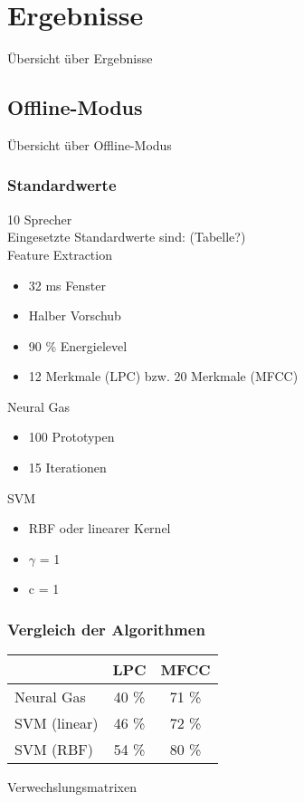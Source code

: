 \chapter{Ergebnisse}
Übersicht über Ergebnisse

\section{Offline-Modus}
Übersicht über Offline-Modus

\subsection{Standardwerte}
10 Sprecher\\
Eingesetzte Standardwerte sind: (Tabelle?)\\
Feature Extraction
\begin{itemize}
	\item 32 ms Fenster
	\item Halber Vorschub
	\item 90 \% Energielevel
	\item 12 Merkmale (LPC) bzw. 20 Merkmale (MFCC)
\end{itemize}
Neural Gas
\begin{itemize}
	\item 100 Prototypen
	\item 15 Iterationen
\end{itemize}
SVM
\begin{itemize}
	\item RBF oder linearer Kernel
	\item $\gamma$ = 1
	\item c = 1
\end{itemize}

\subsection{Vergleich der Algorithmen}
\begin{tabular}{l|c|c}			
	& LPC & MFCC \\
	\hline
	Neural Gas & 40 \% & 71 \% \\
	SVM (linear) & 46 \% & 72 \% \\
	SVM (RBF) & 54 \% & 80 \% \\
\end{tabular}
Verwechslungsmatrixen
		

